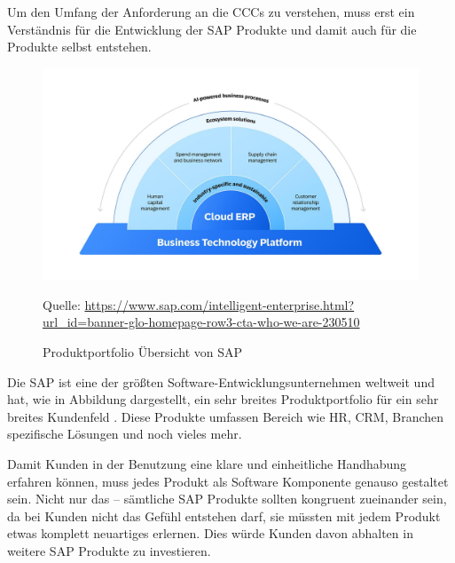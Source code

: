 \documentclass[../main.tex]{subfiles}
\begin{document}
Um den Umfang der Anforderung an die \glspl{CCC} zu verstehen, muss erst ein Verständnis für die Entwicklung der SAP Produkte und damit auch für die Produkte selbst entstehen.

\begin{figure}[ht]
    \centering
    \includegraphics[scale=.21]{"bilder/produktportfolio.jpg"}
    \caption{Produktportfolio Übersicht von SAP}
    \footnotesize Quelle: \url{https://www.sap.com/intelligent-enterprise.html?url_id=banner-glo-homepage-row3-cta-who-we-are-230510}
    \label{fig:produktportfolio}
\end{figure}

Die SAP ist eine der größten Software-Entwicklungsunternehmen weltweit und hat, wie in Abbildung  dargestellt, ein sehr breites Produktportfolio für ein sehr breites Kundenfeld  \cite{CorporateFactSheet}.
Diese Produkte umfassen Bereich wie \gls{HR}, \gls{CRM}, Branchen spezifische Lösungen und noch vieles mehr.

Damit Kunden in der Benutzung eine klare und einheitliche Handhabung erfahren können, muss jedes Produkt als Software Komponente genauso gestaltet sein.
Nicht nur das -- sämtliche SAP Produkte sollten kongruent zueinander sein, da bei Kunden nicht das Gefühl entstehen darf, sie müssten mit jedem Produkt etwas komplett neuartiges erlernen.
Dies würde Kunden davon abhalten in weitere SAP Produkte zu investieren.
\cite{Hier ne passende quelle waere cool}
\end{document}
